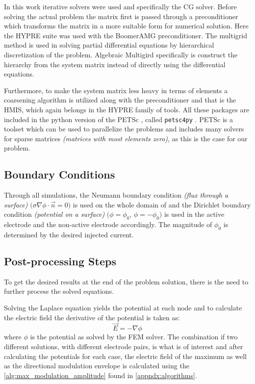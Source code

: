 In this work iterative solvers were used and specifically the \gls{CG} solver. Before solving the actual problem the matrix first is passed through a preconditioner which transforms the matrix in a more suitable form for numerical solution. Here the \gls{HYPRE} \cite{hypre-web-page} suite was used with the Boomer\gls{AMG} \cite[chapter 4]{McCormick1987_amg} preconditioner. The multigrid method is used in solving partial differential equations by hierarchical discretization of the problem. Algebraic Multigird specifically is construct the hierarchy from the system matrix instead of directly using the differential equations. 

Furthermore, to make the system matrix less heavy in terms of elements a coarsening algorithm is utilized along with the preconditioner and that is the \gls{HMIS}, which again belongs in the \gls{HYPRE} family of tools. All these packages are included in the python version of the \gls{PETSc} \cite{petsc-web-page,petsc-user-ref,petsc-efficient}, called \texttt{petsc4py} \cite{Dalcin2011}. \gls{PETSc} is a toolset which can be used to parallelize the problems and includes many solvers for sparse matrices \textit{(matrices with most elements zero)}, as this is the case for our problem.

\subsection{Boundary Conditions}
\label{subsec:solver_boundary_conditions}

Through all simulations, the Neumann boundary condition \textit{(flux through a surface)} $\big(\sigma\nabla\phi\cdot\vec{n} = 0\big)$ is used on the whole domain of and the Dirichlet boundary condition \textit{(potential on a surface)} $\big(\phi = \phi_0$, $\phi = -\phi_0\big)$ is used in the active electrode and the non-active electrode accordingly. The magnitude of $\phi_0$ is determined by the desired injected current.

\subsection{Post-processing Steps}

To get the desired results at the end of the problem solution, there is the need to further process the solved equations.

Solving the Laplace equation yields the potential at each node and to calculate the electric field the derivative of the potential is taken as:
\begin{equation}
	\vec{E} = -\nabla\phi
\end{equation}
where $\phi$ is the potential as solved by the \gls{FEM} solver. The combination if two different solutions, with different electrode pairs, is what is of interest and after calculating the potentials for each case, the electric field of the maximum as well as the directional modulation envelope is calculated using the \autoref{alg:max_modulation_amplitude} found in \autoref{appndx:algorithms}.
